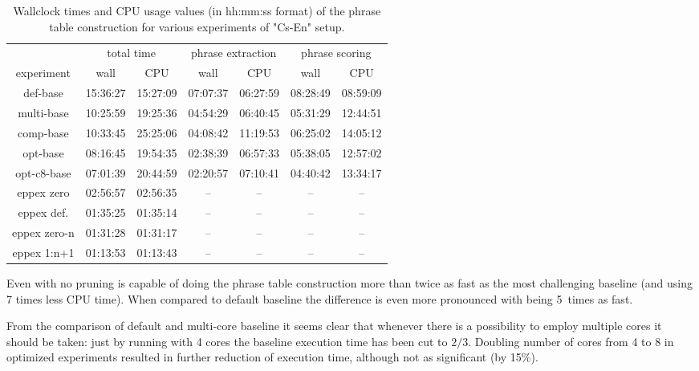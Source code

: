 \begin{table}[ht]
\centering
\begin{tabular}{ | c | c c | c c | c c | }
\hline
 & \multicolumn{2}{|c|}{total time} & \multicolumn{2}{|c|}{phrase extraction} & \multicolumn{2}{|c|}{phrase scoring} \\
experiment & wall & CPU & wall & CPU & wall & CPU \\
\hline
\hline
def-base      & 15:36:27 & 15:27:09 & 07:07:37 & 06:27:59 & 08:28:49 & 08:59:09 \\
multi-base    & 10:25:59 & 19:25:36 & 04:54:29 & 06:40:45 & 05:31:29 & 12:44:51 \\
comp-base     & 10:33:45 & 25:25:06 & 04:08:42 & 11:19:53 & 06:25:02 & 14:05:12 \\
opt-base      & 08:16:45 & 19:54:35 & 02:38:39 & 06:57:33 & 05:38:05 & 12:57:02 \\
opt-c8-base   & 07:01:39 & 20:44:59 & 02:20:57 & 07:10:41 & 04:40:42 & 13:34:17 \\
eppex zero    & 02:56:57 & 02:56:35 &       -- &       -- &       -- &       -- \\
\hline
eppex def.    & 01:35:25 & 01:35:14 &       -- &       -- &       -- &       -- \\
eppex zero-n  & 01:31:28 & 01:31:17 &       -- &       -- &       -- &       -- \\
eppex 1:n+1   & 01:13:53 & 01:13:43 &       -- &       -- &       -- &       -- \\
\hline
\end{tabular}
\caption{\label{cs-en-wmt13-time-benchmarks}
Wallclock times and CPU usage values (in hh:mm:ss format) of the phrase table
construction for various experiments of "Cs-En" setup.}
\end{table}

Even with no pruning \eppex{} is capable of doing the phrase table construction more
than twice as fast as the most challenging baseline (and using 7 times less CPU time).
When compared to default baseline the difference is even more pronounced with \eppex{}
being 5~times as fast.

From the comparison of default and multi-core baseline it seems clear that whenever there
is a possibility to employ multiple cores it should be taken: just by running with 4 cores
the baseline execution time has been cut to $2/3$.
Doubling number of cores from 4 to 8 in optimized experiments resulted in further reduction
of execution time, although not as significant (by 15\%).

